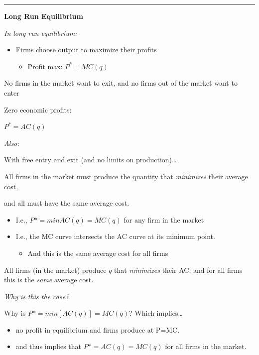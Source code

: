 \documentclass[]{article}
\providecommand{\tightlist}{%
  \setlength{\itemsep}{0pt}\setlength{\parskip}{0pt}}
\begin{document}
\bigskip

\begin{center}\rule{0.5\linewidth}{\linethickness}\end{center}

\textbf{Long Run Equilibrium}

\emph{In long run equilibrium:}

\begin{itemize}
\tightlist
\item
  Firms choose output to maximize their profits

  \begin{itemize}
  \tightlist
  \item
    Profit max: \(P^* = MC(q)\)
  \end{itemize}
\end{itemize}

No firms in the market want to exit, and no firms out of the market want
to enter

Zero economic profits:

\(P^* = AC(q)\)

\emph{Also:}

With free entry and exit (and no limits on production)\ldots{}

All firms in the market must produce the quantity that \emph{minimizes}
their average cost,

and all must have the same average cost.

\begin{itemize}
\tightlist
\item
  I.e., \(P* = min AC(q) = MC(q)\) for any firm in the market
\item
  I.e., the MC curve intersects the AC curve at its minimum point.

  \begin{itemize}
  \tightlist
  \item
    And this is the same average cost for all firms
  \end{itemize}
\end{itemize}

\bigskip

All firms (in the market) produce \(q\) that \emph{minimizes} their AC,
and for all firms this is the \emph{same} average cost.

\emph{Why is this the case?}

Why is \(P* = min [AC(q)] = MC(q)\)? Which implies\ldots{}

\begin{itemize}
\item
  no profit in equilibrium and firms produce at P=MC.
\item
  and thus implies that \(P*=AC(q)=MC(q)\) for all firms in the market.
\end{itemize}
\end{document}

